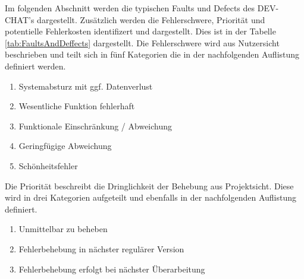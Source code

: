 Im folgenden Abschnitt werden die typischen Faults und Defects des DEV-CHAT's dargestellt.
Zusätzlich werden die Fehlerschwere, Priorität und potentielle Fehlerkosten identifizert und dargestellt.
Dies ist in der Tabelle \ref{tab:FaultsAndDeffects} dargestellt.
Die Fehlerschwere wird aus Nutzersicht beschrieben und teilt sich in fünf Kategorien die in der nachfolgenden Auflistung definiert werden.
\begin{enumerate}
    \item Systemabsturz mit ggf. Datenverlust
    \item Wesentliche Funktion fehlerhaft
    \item Funktionale Einschränkung / Abweichung
    \item Geringfügige Abweichung
    \item Schönheitsfehler
\end{enumerate}
Die Priorität beschreibt die Dringlichkeit der Behebung aus Projektsicht.
Diese wird in drei Kategorien aufgeteilt und ebenfalls in der nachfolgenden Auflistung definiert.
\begin{enumerate}
    \item Unmittelbar zu beheben
    \item Fehlerbehebung in nächster regulärer Version
    \item Fehlerbehebung erfolgt bei nächster Überarbeitung
\end{enumerate}

